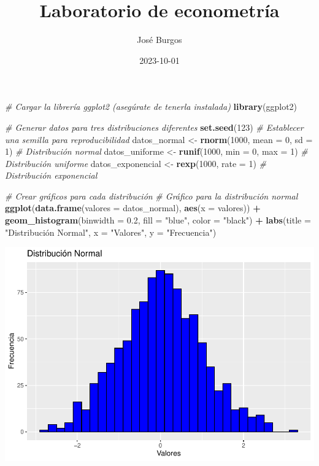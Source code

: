 \documentclass[
]{article}
\title{Laboratorio de econometría}
\author{José Burgos}
\date{2023-10-01}
\newenvironment{Shaded}{\begin{snugshade}}{\end{snugshade}}
\newcommand{\AttributeTok}[1]{\textcolor[rgb]{0.13,0.29,0.53}{#1}}
\newcommand{\CommentTok}[1]{\textcolor[rgb]{0.56,0.35,0.01}{\textit{#1}}}
\newcommand{\DecValTok}[1]{\textcolor[rgb]{0.00,0.00,0.81}{#1}}
\newcommand{\FloatTok}[1]{\textcolor[rgb]{0.00,0.00,0.81}{#1}}
\newcommand{\FunctionTok}[1]{\textcolor[rgb]{0.13,0.29,0.53}{\textbf{#1}}}
\newcommand{\NormalTok}[1]{#1}
\newcommand{\OtherTok}[1]{\textcolor[rgb]{0.56,0.35,0.01}{#1}}
\newcommand{\SpecialCharTok}[1]{\textcolor[rgb]{0.81,0.36,0.00}{\textbf{#1}}}
\newcommand{\StringTok}[1]{\textcolor[rgb]{0.31,0.60,0.02}{#1}}
\begin{document}
\maketitle

\begin{Shaded}
\begin{Highlighting}[]
\CommentTok{\# Cargar la librería ggplot2 (asegúrate de tenerla instalada)}
\FunctionTok{library}\NormalTok{(ggplot2)}

\CommentTok{\# Generar datos para tres distribuciones diferentes}
\FunctionTok{set.seed}\NormalTok{(}\DecValTok{123}\NormalTok{)  }\CommentTok{\# Establecer una semilla para reproducibilidad}
\NormalTok{datos\_normal }\OtherTok{\textless{}{-}} \FunctionTok{rnorm}\NormalTok{(}\DecValTok{1000}\NormalTok{, }\AttributeTok{mean =} \DecValTok{0}\NormalTok{, }\AttributeTok{sd =} \DecValTok{1}\NormalTok{)  }\CommentTok{\# Distribución normal}
\NormalTok{datos\_uniforme }\OtherTok{\textless{}{-}} \FunctionTok{runif}\NormalTok{(}\DecValTok{1000}\NormalTok{, }\AttributeTok{min =} \DecValTok{0}\NormalTok{, }\AttributeTok{max =} \DecValTok{1}\NormalTok{)  }\CommentTok{\# Distribución uniforme}
\NormalTok{datos\_exponencial }\OtherTok{\textless{}{-}} \FunctionTok{rexp}\NormalTok{(}\DecValTok{1000}\NormalTok{, }\AttributeTok{rate =} \DecValTok{1}\NormalTok{)  }\CommentTok{\# Distribución exponencial}

\CommentTok{\# Crear gráficos para cada distribución}
\CommentTok{\# Gráfico para la distribución normal}
\FunctionTok{ggplot}\NormalTok{(}\FunctionTok{data.frame}\NormalTok{(}\AttributeTok{valores =}\NormalTok{ datos\_normal), }\FunctionTok{aes}\NormalTok{(}\AttributeTok{x =}\NormalTok{ valores)) }\SpecialCharTok{+}
  \FunctionTok{geom\_histogram}\NormalTok{(}\AttributeTok{binwidth =} \FloatTok{0.2}\NormalTok{, }\AttributeTok{fill =} \StringTok{"blue"}\NormalTok{, }\AttributeTok{color =} \StringTok{"black"}\NormalTok{) }\SpecialCharTok{+}
  \FunctionTok{labs}\NormalTok{(}\AttributeTok{title =} \StringTok{"Distribución Normal"}\NormalTok{, }\AttributeTok{x =} \StringTok{"Valores"}\NormalTok{, }\AttributeTok{y =} \StringTok{"Frecuencia"}\NormalTok{)}
\end{Highlighting}
\end{Shaded}

\includegraphics{clase02_files/figure-latex/unnamed-chunk-1-1.pdf}
\end{document}
